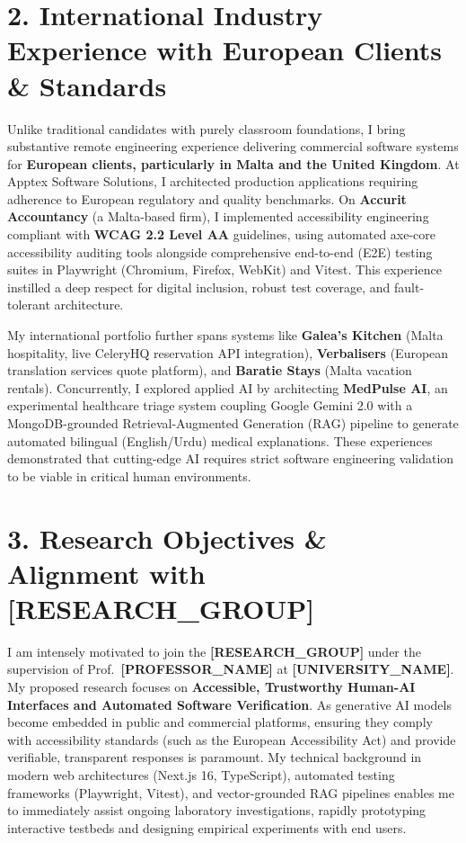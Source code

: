 \documentclass[10pt,a4paper]{article}
\begin{document}
\section{2. International Industry Experience with European Clients \& Standards}
Unlike traditional candidates with purely classroom foundations, I bring substantive remote engineering experience delivering commercial software systems for \textbf{European clients, particularly in Malta and the United Kingdom}. At Apptex Software Solutions, I architected production applications requiring adherence to European regulatory and quality benchmarks. On \textbf{Accurit Accountancy} (a Malta-based firm), I implemented accessibility engineering compliant with \textbf{WCAG 2.2 Level AA} guidelines, using automated axe-core accessibility auditing tools alongside comprehensive end-to-end (E2E) testing suites in Playwright (Chromium, Firefox, WebKit) and Vitest. This experience instilled a deep respect for digital inclusion, robust test coverage, and fault-tolerant architecture.

My international portfolio further spans systems like \textbf{Galea's Kitchen} (Malta hospitality, live CeleryHQ reservation API integration), \textbf{Verbalisers} (European translation services quote platform), and \textbf{Baratie Stays} (Malta vacation rentals). Concurrently, I explored applied AI by architecting \textbf{MedPulse AI}, an experimental healthcare triage system coupling Google Gemini 2.0 with a MongoDB-grounded Retrieval-Augmented Generation (RAG) pipeline to generate automated bilingual (English/Urdu) medical explanations. These experiences demonstrated that cutting-edge AI requires strict software engineering validation to be viable in critical human environments.

\section{3. Research Objectives \& Alignment with [RESEARCH\_GROUP]}
I am intensely motivated to join the \textbf{[RESEARCH\_GROUP]} under the supervision of Prof.~\textbf{[PROFESSOR\_NAME]} at \textbf{[UNIVERSITY\_NAME]}. My proposed research focuses on \textbf{Accessible, Trustworthy Human-AI Interfaces and Automated Software Verification}. As generative AI models become embedded in public and commercial platforms, ensuring they comply with accessibility standards (such as the European Accessibility Act) and provide verifiable, transparent responses is paramount. My technical background in modern web architectures (Next.js 16, TypeScript), automated testing frameworks (Playwright, Vitest), and vector-grounded RAG pipelines enables me to immediately assist ongoing laboratory investigations, rapidly prototyping interactive testbeds and designing empirical experiments with end users.
\end{document}
